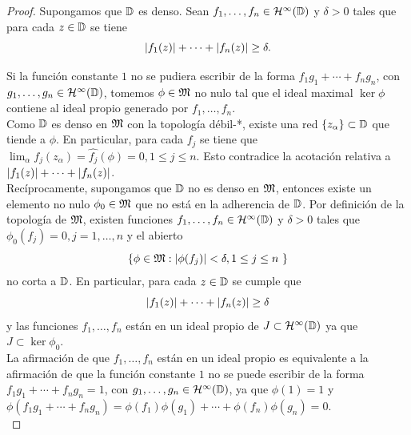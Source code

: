 \begin{proof}
Supongamos que $\mathbb{D}$ es denso. Sean $f_1, \dots, f_n \in \mathcal{H}^{\infty}(\mathbb{D})$ y $\delta > 0$ tales que para cada $z \in \mathbb{D}$ se tiene
\begin{equation*}
    \left\lvert f_1(z)\right\rvert + \cdots + \left\lvert f_n(z)\right\rvert \geq \delta.
\end{equation*}

Si la función constante $1$ no se pudiera escribir de la forma $f_1 g_1 + \cdots + f_n g_n$, con $g_1, \dots, g_n \in \mathcal{H}^{\infty}(\mathbb{D})$, tomemos $\phi \in \mathfrak{M}$ no nulo tal que el ideal maximal $\ker \phi$ contiene al ideal propio generado por $f_1, \dots, f_n$. \\

Como $\mathbb{D}$ es denso en $\mathfrak{M}$ con la topología débil-*, existe una red $\{z_\alpha \} \subset \mathbb{D}$ que tiende a $\phi$. En particular, para cada $f_j$ se tiene que $\lim_\alpha f_j (z_\alpha) = \widehat{f_j} (\phi) = 0, 1 \leq j \leq n$. Esto contradice la acotación relativa a $\left\lvert f_1(z)\right\rvert + \cdots + \left\lvert f_n(z)\right\rvert$. \\

Recíprocamente, supongamos que $\mathbb{D}$ no es denso en $\mathfrak{M}$, entonces existe un elemento no nulo $\phi_0 \in \mathfrak{M}$ que no está en la adherencia de $\mathbb{D}$. Por definición de la topología de $\mathfrak{M}$, existen funciones $f_1, \dots, f_n \in \mathcal{H}^{\infty}(\mathbb{D})$ y $\delta > 0$ tales que $\phi_0 (f_j) = 0, j = 1, \dots, n$ y el abierto
\begin{equation*}
    \{ \phi \in \fiber : \abs{\phi (f_j)} < \delta, 1 \leq j \leq n \}
\end{equation*}
no corta a $\mathbb{D}$. En particular, para cada $z \in \mathbb{D}$ se cumple que
\begin{equation*}
    \left\lvert f_1(z)\right\rvert + \cdots + \left\lvert f_n(z)\right\rvert \geq \delta
\end{equation*}
y las funciones $f_1, \dots, f_n$ están en un ideal propio de $J \subset \mathcal{H}^{\infty}(\mathbb{D})$ ya que $J \subset \ker \phi_0$. \\ %

La afirmación de que $f_1, \dots, f_n$ están en un ideal propio es equivalente a la afirmación de que la función constante $1$ no se puede escribir de la forma $f_1 g_1 + \cdots + f_n g_n = 1$, con $g_1, \dots, g_n \in \mathcal{H}^{\infty}(\mathbb{D})$, ya que $\phi (1) = 1$ y $\phi (f_1 g_1 + \cdots + f_n g_n) = \phi (f_1) \phi (g_1) + \cdots + \phi (f_n) \phi (g_n) = 0$. \\
\end{proof}

